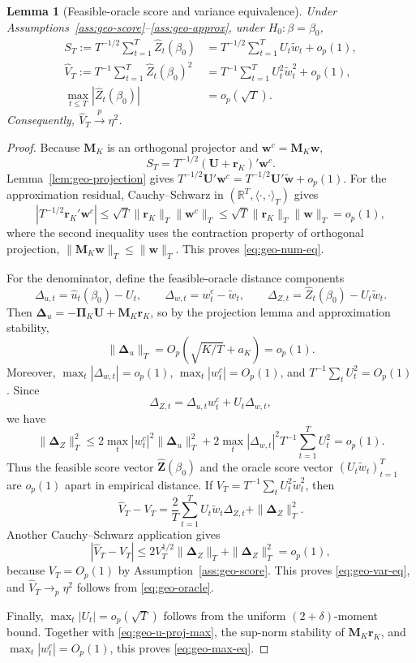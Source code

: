 ﻿\documentclass[11pt]{article}
\newtheorem{lemma}{Lemma}
\begin{document}
\begin{lemma}[Feasible-oracle score and variance equivalence]
\label{lem:geo-score}
Under Assumptions~\ref{ass:geo-score}--\ref{ass:geo-approx}, under \(H_0:\beta=\beta_0\),
\begin{align}
    S_T:=T^{-1/2}\sum_{t=1}^T\widehat Z_t(\beta_0)
      &=T^{-1/2}\sum_{t=1}^TU_t\widetilde w_t+o_p(1),
      \label{eq:geo-num-eq}\\
    \widehat V_T:=T^{-1}\sum_{t=1}^T\widehat Z_t(\beta_0)^2
      &=T^{-1}\sum_{t=1}^TU_t^2\widetilde w_t^2+o_p(1),
      \label{eq:geo-var-eq}\\
    \max_{t\leq T}|\widehat Z_t(\beta_0)|&=o_p(\sqrt T).
      \label{eq:geo-max-eq}
\end{align}
Consequently, \(\widehat V_T\xrightarrow{p}\eta^2\).
\end{lemma}

\begin{proof}
Because \(\bm M_K\) is an orthogonal projector and \(\bm w^c=\bm M_K\bm w\),
\[
    S_T=T^{-1/2}(\bm U+\bm r_K)'\bm w^c.
\]
Lemma~\ref{lem:geo-projection} gives \(T^{-1/2}\bm U'\bm w^c=T^{-1/2}\bm U'\widetilde{\bm w}+o_p(1)\). For the approximation residual, Cauchy--Schwarz in \((\mathbb R^T,\langle\cdot,\cdot\rangle_T)\) gives
\[
    |T^{-1/2}\bm r_K'\bm w^c|
      \leq \sqrt T\|\bm r_K\|_T\|\bm w^c\|_T
      \leq \sqrt T\|\bm r_K\|_T\|\bm w\|_T=o_p(1),
\]
where the second inequality uses the contraction property of orthogonal projection, \(\|\bm M_K\bm w\|_T\leq\|\bm w\|_T\). This proves \eqref{eq:geo-num-eq}.

For the denominator, define the feasible-oracle distance components
\[
    \Delta_{u,t}=\widehat u_t(\beta_0)-U_t,
    \qquad
    \Delta_{w,t}=w_t^c-\widetilde w_t,
    \qquad
    \Delta_{Z,t}=\widehat Z_t(\beta_0)-U_t\widetilde w_t.
\]
Then \(\bm\Delta_u=-\bm\Pi_K\bm U+\bm M_K\bm r_K\), so by the projection lemma and approximation stability,
\[
    \|\bm\Delta_u\|_T=O_p(\sqrt{K/T}+a_K)=o_p(1).
\]
Moreover, \(\max_t|\Delta_{w,t}|=o_p(1)\), \(\max_t|w_t^c|=O_p(1)\), and \(T^{-1}\sum_tU_t^2=O_p(1)\). Since
\[
    \Delta_{Z,t}=\Delta_{u,t}w_t^c+U_t\Delta_{w,t},
\]
we have
\[
    \|\bm\Delta_Z\|_T^2
    \leq 2\max_t|w_t^c|^2\|\bm\Delta_u\|_T^2
      +2\max_t|\Delta_{w,t}|^2T^{-1}\sum_{t=1}^TU_t^2=o_p(1).
\]
Thus the feasible score vector \(\widehat{\bm Z}(\beta_0)\) and the oracle score vector \((U_t\widetilde w_t)_{t=1}^T\) are \(o_p(1)\) apart in empirical distance. If \(V_T=T^{-1}\sum_tU_t^2\widetilde w_t^2\), then
\[
    \widehat V_T-V_T
      =\frac2T\sum_{t=1}^TU_t\widetilde w_t\Delta_{Z,t}
       +\|\bm\Delta_Z\|_T^2.
\]
Another Cauchy--Schwarz application gives
\[
    |\widehat V_T-V_T|
      \leq 2V_T^{1/2}\|\bm\Delta_Z\|_T+\|\bm\Delta_Z\|_T^2=o_p(1),
\]
because \(V_T=O_p(1)\) by Assumption~\ref{ass:geo-score}. This proves \eqref{eq:geo-var-eq}, and \(\widehat V_T\to_p\eta^2\) follows from \eqref{eq:geo-oracle}.

Finally, \(\max_t|U_t|=o_p(\sqrt T)\) follows from the uniform \((2+\delta)\)-moment bound. Together with \eqref{eq:geo-u-proj-max}, the sup-norm stability of \(\bm M_K\bm r_K\), and \(\max_t|w_t^c|=O_p(1)\), this proves \eqref{eq:geo-max-eq}.
\end{proof}
\end{document}
